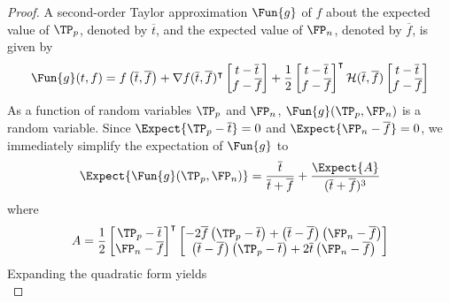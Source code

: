 \begin{proof}
A second-order Taylor approximation $\Fun{g}$ of $f$ about the expected value of $\TP_p$, denoted by $\overline{t}$, and the expected value of $\FP_n$, denoted by $\overline{f}$, is given by
\begin{equation}
    \Fun{g}(t,f) =
    f\left(\overline{t},\overline{f}\right) + \nabla f(\overline{t},\overline{f})^{\intercal}
    \begin{bmatrix}
        t - \overline{t}\\
        f - \overline{f}\\
    \end{bmatrix}
    + \frac{1}{2}
    \begin{bmatrix}
        t - \overline{t}\\
        f - \overline{f}\\
    \end{bmatrix}^{\intercal}
    \mathcal{H}(\overline{t},\overline{f})
    \begin{bmatrix}
        t - \overline{t}\\
        f - \overline{f}\\
    \end{bmatrix}
\end{equation}
As a function of random variables $\TP_p$ and $\FP_n$, $\Fun{g}\!\left(\TP_p,\FP_n\right)$ is a random variable.
Since $\Expect{\TP_p - \overline{t}} = 0$ and $\Expect{\FP_n - \overline{f}} = 0$, we immediately simplify the expectation of $\Fun{g}$ to
\begin{equation}
\label{eq:proof_hess1}
    \Expect{\Fun{g}(\TP_p,\FP_n)} = \frac{\overline{t}}{\overline{t}+\overline{f}} + \frac{\Expect{A}}{(\overline{t} + \overline{f})^3}
\end{equation}
where
\begin{equation}
    A = \frac{1}{2}
    \begin{bmatrix}
        \TP_p - \overline{t}\\
        \FP_n - \overline{f}
    \end{bmatrix}^{\intercal}
    \begin{bmatrix}
        -2 \overline{f} \left(\TP_p - \overline{t}\right) + \left(\overline{t}-\overline{f}\right)\left(\FP_n - \overline{f}\right)\\
        \left(\overline{t}-\overline{f}\right)\left(\TP_p - \overline{t}\right) + 2 \overline{t}\left(\FP_n - \overline{f}\right)
    \end{bmatrix}
\end{equation}
Expanding the quadratic form yields
\begin{equation}

\end{equation}
\end{proof}
